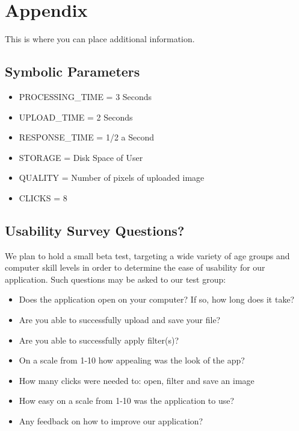 \documentclass[12pt, titlepage]{article}
\begin{document}
\newpage

\section{Appendix}

This is where you can place additional information.

\subsection{Symbolic Parameters}

\begin{itemize}
\item PROCESSING\_TIME = 3 Seconds
\item UPLOAD\_TIME = 2 Seconds
\item RESPONSE\_TIME = 1/2 a Second
\item STORAGE = Disk Space of User
\item QUALITY = Number of pixels of uploaded image
\item CLICKS = 8
\end{itemize}

\subsection{Usability Survey Questions?}

We plan to hold a small beta test, targeting a wide variety of age groups and computer skill levels in order to determine the ease of usability for our application.  Such questions may be asked to our test group:

\begin{itemize}
	\item Does the application open on your computer? If so, how long does it take?
	\item Are you able to successfully upload and save your file?
	\item Are you able to successfully apply filter(s)?
	\item On a scale from 1-10 how appealing was the look of the app?
	\item How many clicks were needed to: open, filter and save an image
	\item How easy on a scale from 1-10 was the application to use?
	\item Any feedback on how to improve our application?
\end{itemize}
\end{document}

